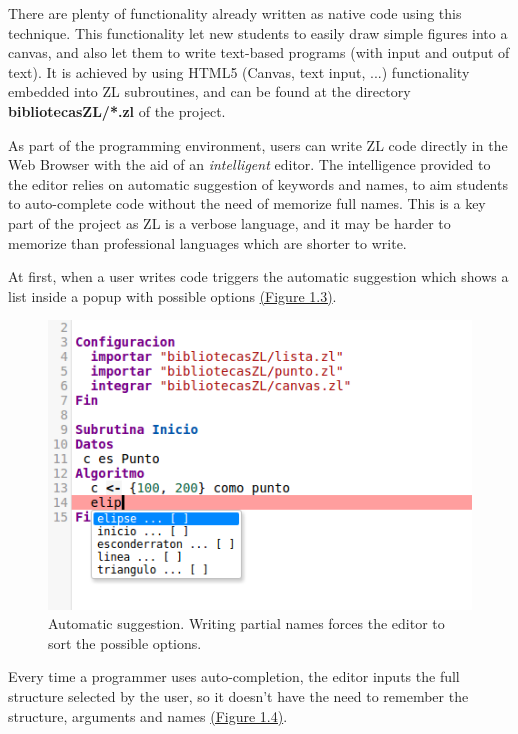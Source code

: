 \documentclass{report}
\begin{document}
	There are plenty of functionality already written as native code using this technique. This functionality let new students to easily draw simple figures into a canvas, and also let them to write text-based programs (with input and output of text). It is achieved by using HTML5 (Canvas, text input, ...) functionality embedded into ZL subroutines, and can be found at the directory \textbf{bibliotecasZL/*.zl} of the project.  

	As part of the programming environment, users can write ZL code directly in the Web Browser with the aid of an \textit{intelligent} editor. The intelligence provided to the editor relies on automatic suggestion of keywords and names, to aim students to auto-complete code without the need of memorize full names. This is a key part of the project as ZL is a verbose language, and it may be harder to memorize than professional languages which are shorter to write.
	
	At first, when a user writes code triggers the automatic suggestion which shows a list inside a popup with possible options \hyperref[fig:beforecompletion]{(Figure 1.3)}.
	
	
\begin{figure}
\centering
\includegraphics[width=0.7\linewidth]{beforecompletion}
\caption[Automatic suggestion]{Automatic suggestion. Writing partial names forces the editor to sort the possible options.}
\label{fig:beforecompletion}
\end{figure}

	Every time a programmer uses auto-completion, the editor inputs the full structure selected by the user, so it doesn't have the need to remember the structure, arguments and names \hyperref[fig:aftercompletion]{(Figure 1.4)}.
	
\end{document}
